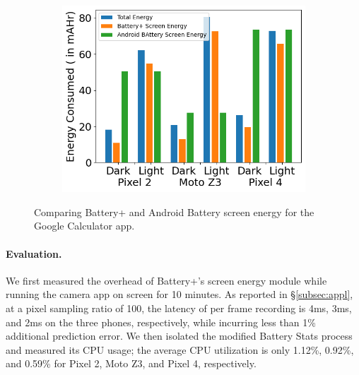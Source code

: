 \begin{figure}[tp]
\begin{minipage}{0.35\columnwidth}
        \vspace{-0.2in}
	\label{fig:tool2_screenshot}
\end{minipage}
\hfill
\begin{minipage}{0.60\columnwidth}
	\begin{subfigure}[]{\textwidth}
		\includegraphics[width=\textwidth]{figure/battery+_screen_energy_compare.png}
	\end{subfigure}
        \vspace{-0.1in}
	\caption{Comparing Battery+ and Android Battery screen energy for the Google Calculator app.}
	\label{fig:tool2_battery_compare}
        \vspace{-0.2in}
\end{minipage}
\end{figure}

\paragraph{Evaluation.}
We first measured the overhead of Battery+'s
screen energy module while running the camera app on
screen for 10 minutes.  As reported in \S\ref{subsec:appl}, at a pixel
sampling ratio of 100, the latency of per frame recording is
4ms, 3ms, and 2ms on the three phones, respectively, while incurring less than
1\% 
additional prediction error.  We then isolated the modified Battery Stats
process and measured its CPU usage; the average CPU utilization is
only 1.12\%, 0.92\%, and 0.59\% for Pixel 2, Moto Z3, and Pixel 4, respectively.

